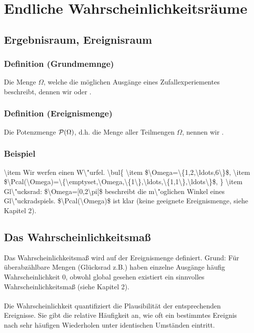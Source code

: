 \section{Endliche Wahrscheinlichkeitsr\"aume}
\subsection{Ergebnisraum, Ereignisraum}
\subsubsection{Definition (Grundmemnge)}
Die Menge $\Omega$, welche die m\"oglichen Ausg\"ange eines Zufallexperiementes beschreibt, dennen wir  oder .
\subsubsection{Definition (Ereignismenge)}
Die Potenzmenge $\Pcal(\Omega)$, d.h. die Menge aller Teilmengen $\Omega$, nennen wir .
\subsubsection{Beispiel}
\num{
\item Wir werfen einen W\"urfel.
\bul{
\item $\Omega=\{1,2,\ldots,6\}$,
\item $\Pcal(\Omega)=\{\emptyset,\Omega,\{1\},\ldots,\{1,1\},\ldots\}$,
}
\item Gl\"ucksrad: $\Omega=[0,2\pi[$ beschreibt die m\"oglichen Winkel eines Gl\"uckradspiels. $\Pcal(\Omega)$ ist klar (keine geeignete Ereignismenge, siehe Kapitel 2).
}
\subsection{Das Wahrscheinlichkeitsma\ss{}}
Das Wahrscheinlichkeitsma\ss{} wird auf der Ereignismenge definiert. Grund: F\"ur \"uberabz\"ahlbare Mengen (Gl\"ucksrad z.B.) haben einzelne Ausg\"ange h\"aufig Wahrscheinlichkeit $0$, obwohl global gesehen existiert ein sinnvolles Wahrscheinlichkeitsma\ss{} (siehe Kapitel 2).
\\~\\
Die Wahrscheinlichkeit quantifiziert die Plausibilit\"at der entsprechenden Ereignisse. Sie gibt die relative H\"aufigkeit an, wie oft ein bestimmtes Ereignis nach sehr h\"aufigen Wiederholen unter identischen Umst\"anden eintritt.
